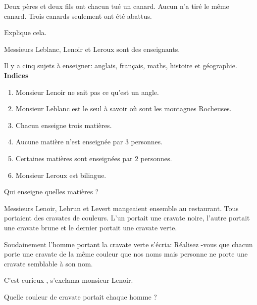 \begin{myenumerate}
  \item Deux pères et deux fils ont chacun tué un canard. Aucun n'a tiré
le même canard. Trois  canards seulement ont été abattus.\par Explique
cela. 
\item Messieurs Leblanc, Lenoir et Leroux sont des enseignants.

Il y a cinq sujets à enseigner: anglais, français, maths, histoire
et géographie.\\

\textbf{Indices}

\begin{enumerate}
    \item Monsieur Lenoir ne sait pas ce qu'est un angle.
    \item Monsieur Leblanc est le seul à savoir où sont les montagnes Rocheuses.
    \item Chacun enseigne trois matières.
    \item Aucune matière n'est enseignée par 3 personnes.
    \item Certaines matières sont enseignées par 2 personnes.
    \item Monsieur Leroux est bilingue.
\end{enumerate}

Qui enseigne quelles matières ? 
\item Messieurs Lenoir, Lebrun et Levert mangeaient ensemble au
restaurant. Tous portaient des cravates de couleurs. L'un portait
une cravate noire, l'autre portait une cravate brune et le
dernier portait une cravate verte.

Soudainement l'homme portant la cravate verte s'écria: \og
Réalisez -vous que chacun porte une cravate de la même couleur que
nos noms mais personne ne porte une cravate semblable à son nom.
\fg

\og C'est curieux \fg, s'exclama monsieur Lenoir.

Quelle couleur de cravate portait chaque homme ? 
\end{myenumerate}
